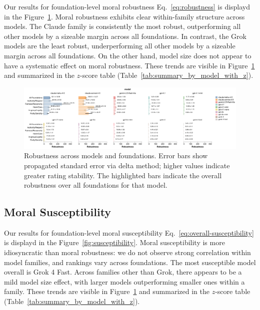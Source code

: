 \documentclass{article}
\begin{document}
Our results for foundation-level moral robustness Eq.~\eqref{eq:robustness} is displayd in the Figure~\ref{fig:robustness}. Moral robustness exhibits clear within-family structure across models. The Claude family is consistently the most robust, outperforming all other models by a sizeable margin across all foundations. In contrast, the Grok models are the least robust, underperforming all other models by a sizeable margin across all foundations. On the other hand, model size does not appear to have a systematic effect on moral robustness. These trends are visible in Figure~\ref{fig:robustness} and summarized in the $z$-score table (Table~\ref{tab:summary_by_model_with_z}).

\begin{figure}[!t]
  \centering
  \includegraphics[width=0.9\linewidth]{../results/robustness_bars.pdf}\hfill
  \caption{Robustness across models and foundations. Error bars show propagated standard error via delta method; higher values indicate greater rating stability. The highlighted bars indicate the overall robustness over all foundations for that model.}
  \label{fig:robustness}
\end{figure}

\subsection{Moral Susceptibility}

Our results for foundation-level moral susceptibility Eq.~\eqref{eq:overall-susceptibility} is displayd in the Figure~\ref{fig:susceptibility}. Moral susceptibility is more idiosyncratic than moral robustness: we do not observe strong correlation within model families, and rankings vary across foundations. The most susceptible model overall is Grok 4 Fast. Across families other than Grok, there appears to be a mild model size effect, with larger models outperforming smaller ones within a family. These trends are visible in Figure~\ref{fig:robustness} and summarized in the $z$-score table (Table~\ref{tab:summary_by_model_with_z}).
\end{document}
